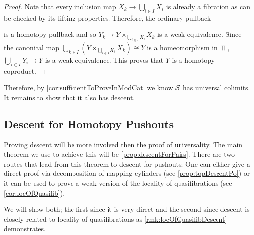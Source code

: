 \begin{lemma}
\begin{proof}
            Note that every inclusion map $X_k\to\bigcup\limits_{i\in I} X_i$ is already a fibration as can be checked by its lifting properties.
            Therefore, the ordinary pullback
            \begin{center}
            \end{center}
            is a homotopy pullback and so $Y_k\to Y\times_{\bigcup\limits_{i\in I} X_i}X_k$ is a weak equivalence.
            Since the canonical map $\bigcup\limits_{k\in I}\left(Y\times_{\bigcup\limits_{i\in I} X_i}X_k\right)\cong Y$ is a homeomorphism in $\Top$, $\bigcup\limits_{i\in I}Y_i\to Y$ is a weak equivalence.
            This proves that $Y$ is a homotopy coproduct.
    \end{proof}
\end{lemma}
Therefore, by \cref{cor:sufficientToProveInModCat} we know $\mathcal{S}$ has universal colimits.
It remains to show that it also has descent.
\subsection*{Descent for Homotopy Pushouts}
Proving descent will be more involved then the proof of universality.
The main theorem we use to achieve this will be \cref{prop:descentForPairs}. 
There are two routes that lead from this theorem to descent for pushouts:
One can either give a direct proof via decomposition of mapping cylinders (see \cref{prop:topDescentPo}) or it can be used to prove a weak version of the locality of quasifibrations (see \cref{cor:locOfQuasifib}).

We will show both; 
the first since it is very direct and the second since descent is closely related to locality of quasifibrations as \cref{rmk:locOfQuasifibDescent} demonstrates.

